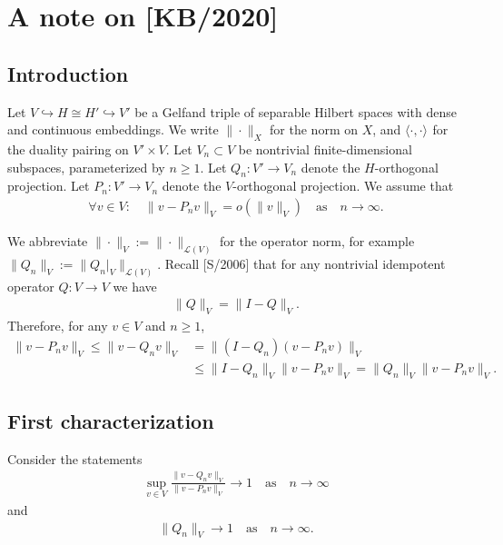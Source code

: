 \documentclass[12pt]{article}
\newcommand{\norm}[2]{\|#1\|_{#2}}
\newcommand{\scalar}[2]{\langle#1\rangle_{#2}}
\newcommand{\from}{\colon}
\begin{document}
	
	\section*{A note on [KB/2020]}
	
	
	\subsection*{Introduction}
	
	
	
	Let $V \hookrightarrow H \cong H' \hookrightarrow V'$
	be a Gelfand triple of separable Hilbert spaces with dense and continuous embeddings.
	We write $\norm{\cdot}{X}$ for the norm on $X$,
	and
	$\scalar{\cdot, \cdot}{}$ for the duality pairing on $V' \times V$.
	Let $V_n \subset V$ be nontrivial finite-dimensional subspaces, 
	parameterized by $n \geq 1$.
	Let $Q_n \from V' \to V_n$ denote the $H$-orthogonal projection.
	Let $P_n \from V' \to V_n$ denote the $V$-orthogonal projection.
	We assume that
	\begin{align}
		\label{e:P}
		\forall v \in V:
		\quad
		\norm{v - P_n v}{V} = o(\norm{v}{V})
		\quad\text{as}\quad
		n \to \infty
		.
	\end{align}
	
	We abbreviate $\norm{\cdot}{V} := \norm{\cdot}{\mathcal{L}(V)}$ 
	for the operator norm,
	for example
	$\norm{Q_n}{V} := \norm{Q_n|_V}{\mathcal{L}(V)}$.
	Recall [S/2006]
	that for any nontrivial idempotent operator $Q \from V \to V$ we have
	\begin{align}
		\label{e:IQ}
		\norm{Q}{V} = \norm{I - Q}{V}
		.
	\end{align}
	Therefore, for any $v \in V$ and $n \geq 1$,
	\begin{align}
		\norm{v - P_n v}{V}
		\leq
		\norm{v - Q_n v}{V}
		& =
		\norm{(I - Q_n)(v - P_n v)}{V}
		\\
		& \leq
		\norm{I - Q_n}{V} \norm{v - P_n v}{V}
		=
		\norm{Q_n}{V} \norm{v - P_n v}{V}
		.
	\end{align}
	
	
	
	
	\subsection*{First characterization}
	
	
	Consider the statements
	\begin{align}
		\label{e:1}
		\sup_{v \in V}
		\frac{
			\norm{v - Q_n v}{V}
		}{
			\norm{v - P_n v}{V}
		}
		\to 1
		\quad\text{as}\quad
		n \to \infty
	\end{align}
	and
	\begin{align}
		\label{e:Q1}
		\norm{Q_n}{V} \to 1
		\quad\text{as}\quad
		n \to \infty
		.
	\end{align}
	
\end{document}
